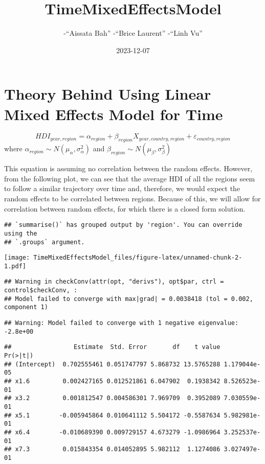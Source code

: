\documentclass[
]{article}
\title{TimeMixedEffectsModel}
\author{-``Aissata Bah'' -``Brice Laurent'' -``Linh Vu''}
\date{2023-12-07}
\begin{document}
\maketitle

\hypertarget{theory-behind-using-linear-mixed-effects-model-for-time}{%
\section{Theory Behind Using Linear Mixed Effects Model for
Time}\label{theory-behind-using-linear-mixed-effects-model-for-time}}

\[HDI_{year,region} = \alpha_{region}+\beta_{region}X_{year,country,region}+\varepsilon_{country,region}\]
where \(\alpha_{region}\sim N(\mu_{\alpha},\sigma_{\alpha}^2)\) and
\(\beta_{region}\sim N(\mu_{\beta},\sigma_{\beta}^2)\)

This equation is assuming no correlation between the random effects.
However, from the following plot, we can see that the average HDI of all
the regions seem to follow a similar trajectory over time and,
therefore, we would expect the random effects to be correlated between
regions. Because of this, we will allow for correlation between random
effects, for which there is a closed form solution.

\begin{verbatim}
## `summarise()` has grouped output by 'region'. You can override using the
## `.groups` argument.
\end{verbatim}

\texttt{[image: TimeMixedEffectsModel\_files/figure-latex/unnamed-chunk-2-1.pdf]}

\begin{verbatim}
## Warning in checkConv(attr(opt, "derivs"), opt$par, ctrl = control$checkConv, :
## Model failed to converge with max|grad| = 0.0038418 (tol = 0.002, component 1)
\end{verbatim}

\begin{verbatim}
## Warning: Model failed to converge with 1 negative eigenvalue: -2.8e+00
\end{verbatim}

\begin{verbatim}
##                 Estimate  Std. Error       df    t value     Pr(>|t|)
## (Intercept)  0.702555461 0.051747797 5.868732 13.5765288 1.179044e-05
## x1.6         0.002427165 0.012521861 6.047902  0.1938342 8.526523e-01
## x3.2         0.001812547 0.004586301 7.969709  0.3952089 7.030559e-01
## x5.1        -0.005945864 0.010641112 5.504172 -0.5587634 5.982981e-01
## x6.4        -0.010689390 0.009729157 4.673279 -1.0986964 3.252537e-01
## x7.3         0.015843354 0.014052895 5.982112  1.1274086 3.027497e-01
\end{verbatim}
\end{document}
